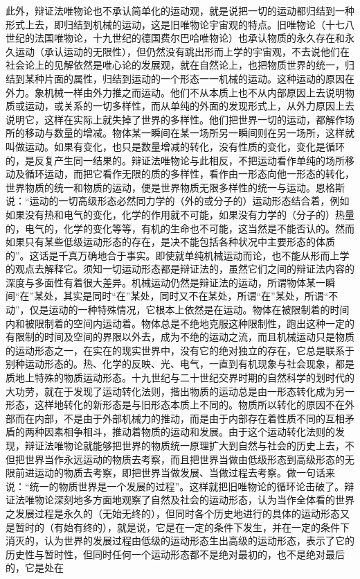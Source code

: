 此外，辩证法唯物论也不承认简单化的运动观，就是说把一切的运动都归结到一种形式上去，即归结到机械的运动，这是旧唯物论宇宙观的特点。旧唯物论（十七八世纪的法国唯物论，十九世纪的德国费尔巴哈唯物论）也承认物质的永久存在和永久运动（承认运动的无限性），但仍然没有跳出形而上学的宇宙观，不去说他们在社会论上的见解依然是唯心论的发展观，就在自然论上，也把物质世界的统一，归结到某种片面的属性，归结到运动的一个形态一一机械的运动。这种运动的原因在外力。象机械一样由外力推之而运动。他们不从本质上也不从内部原因上去说明物质或运动，或关系的一切多样性，而从单纯的外面的发现形式上，从外力原因上去说明它，这样在实际上就失掉了世界的多样性。他们把世界一切的运动，都解作场所的移动与数量的增减。物体某一瞬间在某一场所另一瞬间则在另一场所，这样就叫做运动。如果有变化，也只是数量增减的转化，没有性质的变化，变化是循环的，是反复产生同一结果的。辩证法唯物论与此相反，不把运动看作单纯的场所移动及循环运动，而把它看作无限的质的多样性，看作由一形态向他一形态的转化，世界物质的统一和物质的运动，便是世界物质无限多样性的统一与运动。恩格斯说：“运动的一切高级形态必然同力学的（外的或分子的）运动形态结合着，例如如果没有热和电气的变化，化学的作用就不可能，如果没有力学的（分子的）热量的，电气的，化学的变化等等，有机的生命也不可能，这当然是不能否认的。然而如果只有某些低级运动形态的存在，是决不能包括各种状况中主要形态的体质的”。这话是千真万确地合于事实。即使就单纯机械运动而论，也不能从形而上学的观点去解释它。须知一切运动形态都是辩证法的，虽然它们之间的辩证法内容的深度与多面性有着很大差异。机械运动仍然是辩证法的运动，所谓物体某一瞬间“在”某处，其实是同时“在”某处，同时又不在某处，所谓“在”某处，所谓“不动”，仅是运动的一种特殊情况，它根本上依然是在运动。物体在被限制着的时间内和被限制着的空间内运动着。物体总是不绝地克服这种限制性，跑出这种一定的有限制的时间及空间的界限以外去，成为不绝的运动之流，而且机械运动只是物质的运动形态之一，在实在的现实世界中，没有它的绝对独立的存在，它总是联系于别种运动形态的。热、化学的反映、光、电气，一直到有机现象与社会现象，都是质地上特殊的物质运动形态。十九世纪与二十世纪交界时期的自然科学的划时代的大功劳，就在于发现了运动转化法则，揩出物质的运动总是由一形态转化成为另一形态，这样地转化的新形态是与旧形态本质上不同的。物质所以转化的原因不在外部而在内部，不是由于外部机械力的推动，而是由于内部存在着性质不同的互相矛盾的两种因素相争相斗，推动着物质的运动和发展。由于这个运动转化法则的发现，辩证法唯物论就能够把世界的物质统一原理扩大到自然与社会的历史上去，不但把世界当作永远运动的物质去考察，而且把世界当做由低级形态到高级形态的无限前进运动的物质去考察，即把世界当做发展、当做过程去考察。做一句话来说：“统一的物质世界是一个发展的过程”。这样就把旧唯物论的循环论击破了。辩证法唯物论深刻地多方面地观察了自然及社会的运动形态，认为当作全体看的世界之发展过程是永久的（无始无终的），但同时各个历史地进行的具体的运动形态又是暂时的（有始有终的），就是说，它是在一定的条件下发生，并在一定的条件下消灭的，认为世界的发展过程由低级的运动形态生出高级的运动形态，表示了它的历史性与暂时性，但同时任何一个运动形态都不是绝对最初的，也不是绝对最后的，它是处在